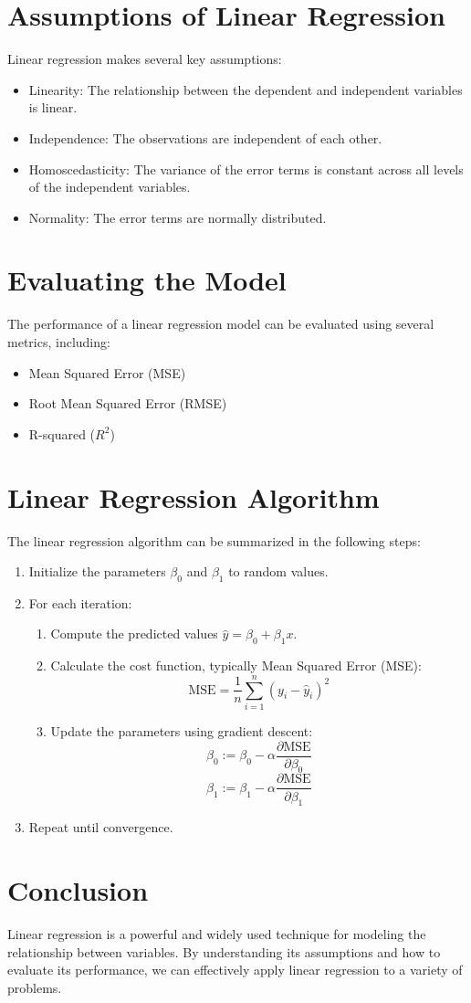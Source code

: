 \documentclass{article}
\begin{document}
\section{Assumptions of Linear Regression}
Linear regression makes several key assumptions:
\begin{itemize}
    \item Linearity: The relationship between the dependent and independent variables is linear.
    \item Independence: The observations are independent of each other.
    \item Homoscedasticity: The variance of the error terms is constant across all levels of the independent variables.
    \item Normality: The error terms are normally distributed.
\end{itemize}

\section{Evaluating the Model}
The performance of a linear regression model can be evaluated using several metrics, including:
\begin{itemize}
    \item Mean Squared Error (MSE)
    \item Root Mean Squared Error (RMSE)
    \item R-squared (\( R^2 \))
\end{itemize}

\section{Linear Regression Algorithm}

The linear regression algorithm can be summarized in the following steps:

\begin{enumerate}
    \item Initialize the parameters \( \beta_0 \) and \( \beta_1 \) to random values.
    \item For each iteration:
    \begin{enumerate}
        \item Compute the predicted values \( \hat{y} = \beta_0 + \beta_1 x \).
        \item Calculate the cost function, typically Mean Squared Error (MSE):
        \[
        \text{MSE} = \frac{1}{n} \sum_{i=1}^{n} (y_i - \hat{y}_i)^2
        \]
        \item Update the parameters using gradient descent:
        \[
        \beta_0 := \beta_0 - \alpha \frac{\partial \text{MSE}}{\partial \beta_0}
        \]
        \[
        \beta_1 := \beta_1 - \alpha \frac{\partial \text{MSE}}{\partial \beta_1}
        \]
    \end{enumerate}
    \item Repeat until convergence.
\end{enumerate}

\section{Conclusion}
Linear regression is a powerful and widely used technique for modeling the relationship between variables. By understanding its assumptions and how to evaluate its performance, we can effectively apply linear regression to a variety of problems.
\end{document}
